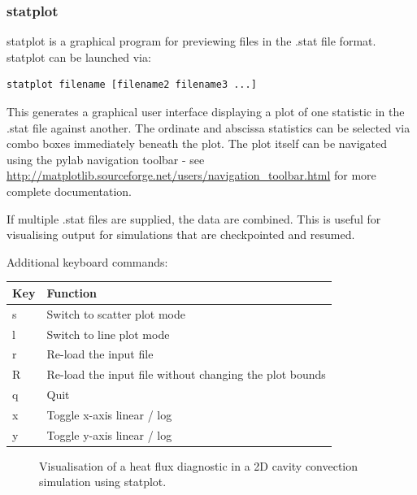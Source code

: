
\subsubsection{statplot}
\label{sec:statplot}

statplot is a graphical program for previewing files in the .stat file format.
statplot can be launched via:

\begin{lstlisting}[language = Bash]
statplot filename [filename2 filename3 ...]
\end{lstlisting}

This generates a graphical user interface displaying a plot of one statistic in
the .stat file against another. The ordinate and abscissa statistics can be
selected via combo boxes immediately beneath the plot. The plot itself can
be navigated using the pylab navigation toolbar - see
\url{http://matplotlib.sourceforge.net/users/navigation_toolbar.html} for
more complete documentation.

If multiple .stat files are supplied, the data are combined. This is useful for
visualising output for simulations that are checkpointed and resumed.

Additional keyboard commands:

\begin{center}
  \begin{tabular}{| l | l |}
    \hline
    Key & Function \\
    \hline
    s   & Switch to scatter plot mode \\
    l   & Switch to line plot mode \\
    r   & Re-load the input file \\
    R   & Re-load the input file without changing the plot bounds \\
    q   & Quit \\
    x   & Toggle x-axis linear / log \\
    y   & Toggle y-axis linear / log \\
    \hline
  \end{tabular}
\end{center}

\begin{figure}[ht]
  \centering
  \caption{Visualisation of a heat flux diagnostic in a 2D cavity convection
           simulation using statplot.}
  \label{fig:statplot}
\end{figure}

